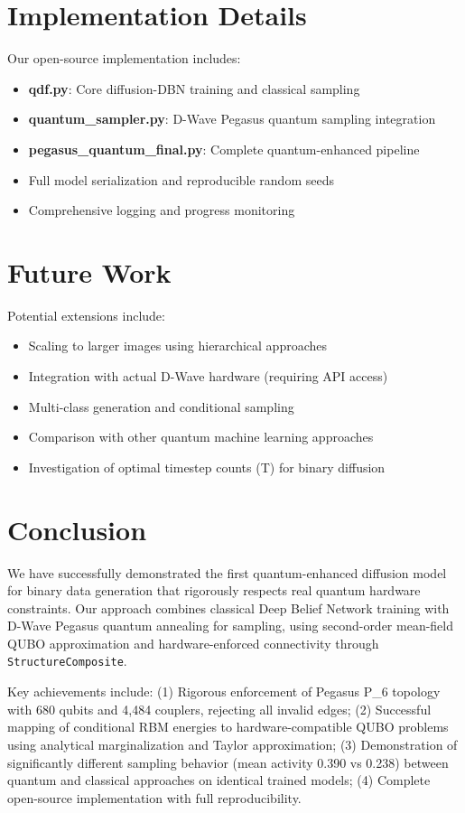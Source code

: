 \documentclass[11pt]{article}
\begin{document}
\section{Implementation Details}

Our open-source implementation includes:
\begin{itemize}
    \item \textbf{qdf.py}: Core diffusion-DBN training and classical sampling
    \item \textbf{quantum\_sampler.py}: D-Wave Pegasus quantum sampling integration  
    \item \textbf{pegasus\_quantum\_final.py}: Complete quantum-enhanced pipeline
    \item Full model serialization and reproducible random seeds
    \item Comprehensive logging and progress monitoring
\end{itemize}

\section{Future Work}

Potential extensions include:
\begin{itemize}
    \item Scaling to larger images using hierarchical approaches
    \item Integration with actual D-Wave hardware (requiring API access)
    \item Multi-class generation and conditional sampling
    \item Comparison with other quantum machine learning approaches
    \item Investigation of optimal timestep counts (T) for binary diffusion
\end{itemize}

\section{Conclusion}

We have successfully demonstrated the first quantum-enhanced diffusion model for binary data generation that rigorously respects real quantum hardware constraints. Our approach combines classical Deep Belief Network training with D-Wave Pegasus quantum annealing for sampling, using second-order mean-field QUBO approximation and hardware-enforced connectivity through \texttt{StructureComposite}.

Key achievements include: (1) Rigorous enforcement of Pegasus P_6 topology with 680 qubits and 4,484 couplers, rejecting all invalid edges; (2) Successful mapping of conditional RBM energies to hardware-compatible QUBO problems using analytical marginalization and Taylor approximation; (3) Demonstration of significantly different sampling behavior (mean activity 0.390 vs 0.238) between quantum and classical approaches on identical trained models; (4) Complete open-source implementation with full reproducibility.
\end{document}
